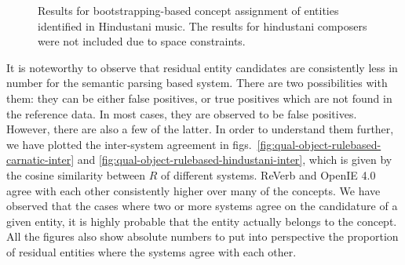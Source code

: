 \documentclass{llncs}
\begin{document}
{\begin{figure}[t]
\begin{center}
{		 \label{fig:qual-object-bootstrapping-hindustani-instrumentalists}
        }%
        \qquad
\end{center}
\caption{Results for bootstrapping-based concept assignment of entities identified in Hindustani music. The results for hindustani composers were not included due to space constraints.}
\label{fig:qual-object-bootstrapping-hindustani}
\end{figure}
}

It is noteworthy to observe that residual entity candidates are consistently less in number for the semantic parsing based system. There are two possibilities with them: they can be either false positives, or true positives which are not found in the reference data. In most cases, they are observed to be false positives. However, there are also a few of the latter. In order to understand them further, we have plotted the inter-system agreement in figs.~\ref{fig:qual-object-rulebased-carnatic-inter} and \ref{fig:qual-object-rulebased-hindustani-inter}, which is given by the cosine similarity between $R$ of different systems. ReVerb and OpenIE 4.0 agree with each other consistently higher over many of the concepts. We have observed that the cases where two or more systems agree on the candidature of a given entity, it is highly probable that the entity actually belongs to the concept. All the figures also show absolute numbers to put into perspective the proportion of residual entities where the systems agree with each other.
\end{document}
